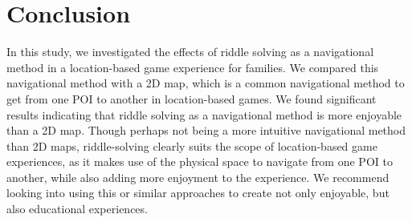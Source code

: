 \section{Conclusion}
In this study, we investigated the effects of riddle solving as a navigational method in a location-based game experience for families. We compared this navigational method with a 2D map, which is a common navigational method to get from one POI to another in location-based games. We found significant results indicating that riddle solving as a navigational method is more enjoyable than a 2D map. Though perhaps not being a more intuitive navigational method than 2D maps, riddle-solving clearly suits the scope of location-based game experiences, as it makes use of the physical space to navigate from one POI to another, while also adding more enjoyment to the experience. We recommend looking into using this or similar approaches to create not only enjoyable, but also educational experiences. 